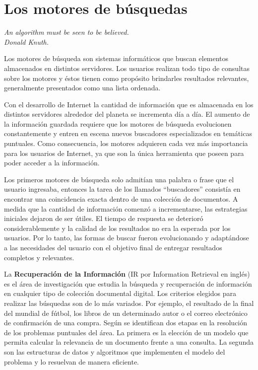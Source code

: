\section{Los motores de búsquedas}
{\begin{small}%
\begin{flushright}%
\it An algorithm must be seen to be believed.\\Donald Knuth.
\end{flushright}%
\end{small}%
\vspace{.5cm}}
Los motores de búsqueda son sistemas informáticos que buscan elementos almacenados en distintos servidores. Los usuarios realizan todo tipo de consultas sobre los motores y éstos tienen como propósito brindarles resultados relevantes, generalmente presentados como una lista ordenada.

Con el desarrollo de Internet la cantidad de información que es almacenada en los distintos servidores alrededor del planeta se incrementa día a día. El aumento de la información guardada requiere que los motores de búsqueda evolucionen constantemente y entren en escena nuevos buscadores especializados en temáticas puntuales. Como consecuencia, los motores adquieren cada vez más importancia para los usuarios de Internet, ya que son la única herramienta que poseen para poder acceder a la información.

Los primeros motores de búsqueda solo admitían una palabra o frase que el usuario ingresaba, entonces la tarea de los llamados ``buscadores'' consistía en encontrar una coincidencia exacta dentro de una colección de documentos. A medida que la cantidad de información comenzó a incrementarse, las estrategias iniciales dejaron de ser útiles.
El tiempo de respuesta se deterioró considerablemente y la calidad de los resultados no era la esperada por los usuarios. Por lo tanto, las formas de buscar fueron evolucionando y adaptándose a las necesidades del usuario con el objetivo final de entregar resultados completos y relevantes.

La \textbf{Recuperación de la Información} (IR por Information Retrieval en inglés) \cite{Baeza-Yates:1999:MIR:553876,Manning:2008:IIR:1394399,Zobel:2006:IFT:1132956.1132959} es el área de investigación que estudia la búsqueda y recuperación de información en cualquier tipo de colección documental digital. Los criterios elegidos para realizar las búsquedas son de lo más variados. Por ejemplo, el resultado de la final del mundial de fútbol, los libros de un determinado autor o el correo electrónico de confirmación de una compra. Según \cite{Baeza-Yates:1999:MIR:553876} se identifican dos etapas en la resolución de los problemas puntuales del área. La primera es la elección de un modelo que permita calcular la relevancia de un documento frente a una consulta. La segunda son las estructuras de datos y algoritmos que implementen el modelo del problema y lo resuelvan de manera eficiente.

